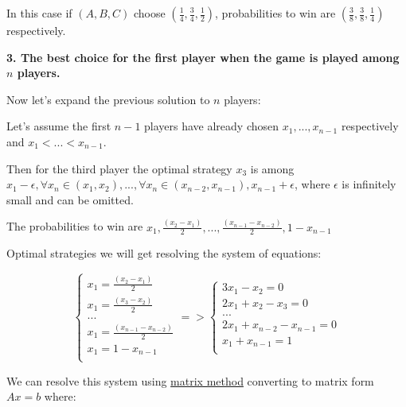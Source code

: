 \documentclass[12pt]{article}
\begin{document}
In this case if $(A, B, C)$ choose $(\frac{1}{4}, \frac{3}{4}, \frac{1}{2})$, 
probabilities to win are $(\frac{3}{8}, \frac{3}{8}, \frac{1}{4})$ respectively.

\newpage

\textbf{3. The best choice for the first player when the game is 
played among $n$ players.}


Now let's expand the previous solution to $n$ players:

Let's assume the first $n-1$ players have already chosen 
$x_1, ..., x_{n-1}$ respectively and $x_1 < ... < x_{n-1}$.

Then for the third player the optimal strategy $x_3$ is among \newline
$x_1 - \epsilon, \forall x_n \in (x_1, x_2), ..., 
\forall x_n \in (x_{n-2}, x_{n-1}), x_{n-1} + \epsilon$, 
where $\epsilon$ is infinitely small and can be omitted.

The probabilities to win are
$x_1, \frac{(x_2 - x_1)}{2}, ..., \frac{(x_{n-1} - x_{n-2})}{2}, 1 - x_{n-1}$

Optimal strategies we will get resolving the system of equations:

$$\begin{cases} 
x_1 = \frac{(x_2 - x_1)}{2} \\
x_1 = \frac{(x_3 - x_2)}{2} \\
... \\
x_1 = \frac{(x_{n-1} - x_{n-2})}{2} \\
x_1 = 1 - x_{n-1} \\
\end{cases}
=>
\begin{cases} 
3x_1 - x_2 = 0 \\
2x_1 + x_2 - x_3 = 0 \\
... \\
2x_1 + x_{n-2} - x_{n-1} = 0 \\
x_1 + x_{n-1} = 1 \\
\end{cases}$$

We can resolve this system using 
\href{https://en.wikipedia.org/wiki/System_of_linear_equations#Matrix_solution}
{matrix method} converting to matrix form $Ax = b$ where:
\end{document}
